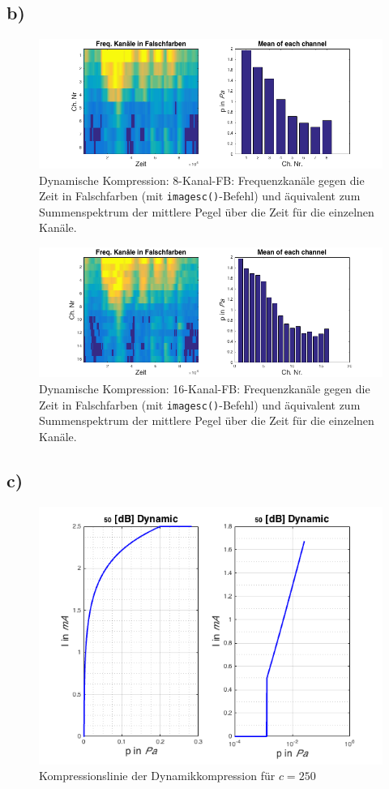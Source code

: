 \documentclass[
a4paper, 
12pt, 
]{article}
\begin{document}
\subsection*{b)}
\begin{figure}[h]
\centering
\includegraphics[width=0.9\linewidth]{Plots/b2_8ch}
\caption{Dynamische Kompression: 8-Kanal-FB: Frequenzkanäle gegen die Zeit in Falschfarben (mit \texttt{imagesc()}-Befehl) und äquivalent zum Summenspektrum der mittlere Pegel über die Zeit für die einzelnen Kanäle.}
\label{fig:b2_8ch}
\end{figure}

\begin{figure}[h]
\centering
\includegraphics[width=0.9\linewidth]{Plots/b2_16ch}
\caption{Dynamische Kompression: 16-Kanal-FB: Frequenzkanäle gegen die Zeit in Falschfarben (mit \texttt{imagesc()}-Befehl) und äquivalent zum Summenspektrum der mittlere Pegel über die Zeit für die einzelnen Kanäle.}
\label{fig:b2_16ch}
\end{figure}

\clearpage
\subsection*{c)}
\begin{figure}[h]
\centering
\includegraphics[width=0.6\linewidth]{Plots/c2_250}
\caption{Kompressionslinie der Dynamikkompression für $c = 250$}
\label{fig:c2_250}
\end{figure}
\end{document}
